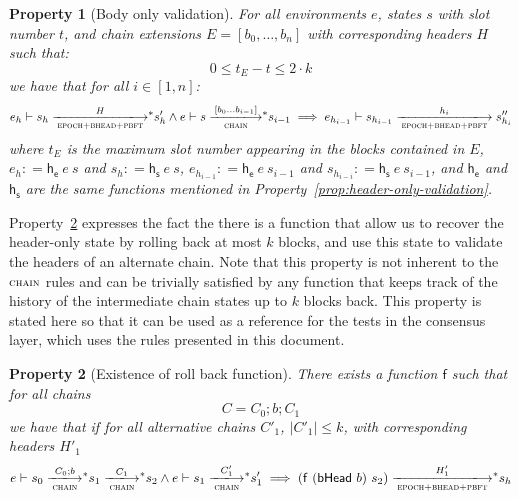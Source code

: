 \documentclass[11pt,a4paper]{article}
\newcommand{\fun}[1]{\mathsf{#1}}
\newcommand{\size}[1]{\left| #1 \right|}
\newcommand{\trans}[2]{\xlongrightarrow[\textsc{#1}]{#2}}
\newcommand{\stslabel}[1]{\footnotesize{\textsc{#1}}}
\newcommand{\leteq}{\ensuremath{\mathrel{\mathop:}=}}
\newcommand{\transtar}[2]{\xlongrightarrow[\textsc{#1}]{#2}\negthickspace^{*}}
\newtheorem{property}{Property}
\begin{document}
\begin{property}[Body only validation]\label{prop:body-only-validation}
  For all environments $e$, states $s$ with slot number $t$, and chain
  extensions $E = [b_0, \ldots, b_n]$ with corresponding headers $H$ such that:
  $$
  0 \leq t_E - t  \leq 2 \cdot k
  $$
  we have that for all $i \in [1, n]$:
  $$
  e_h \vdash s_h \transtar{epoch+bhead+pbft}{H} s'_h
  \wedge
  e \vdash s \transtar{chain}{[b_0 \ldots b_{i-1}]} s_{i-1}
  \implies
  e_{h_{i-1}} \vdash s_{h_{i-1}}\trans{epoch+bhead+pbft}{h_i} s''_{h_{i}}
  $$
  where $t_E$ is the maximum slot number appearing in the blocks contained in
  $E$, $e_h \leteq \fun{h_e}~e~s$ and $s_h \leteq \fun{h_s}~e~s$,
  $e_{h_{i-1}} \leteq \fun{h_e}~e~s_{i-1}$ and
  $s_{h_{i-i}} \leteq \fun{h_s}~e~s_{i-1}$, and $\fun{h_e}$ and $\fun{h_s}$ are
  the same functions mentioned in Property~\ref{prop:header-only-validation}.
\end{property}

Property~\ref{prop:roll-back-funk} expresses the fact the there is a function
that allow us to recover the header-only state by rolling back at most $k$
blocks, and use this state to validate the headers of an alternate chain. Note
that this property is not inherent to the $\stslabel{chain}$ rules and can be
trivially satisfied by any function that keeps track of the history of the
intermediate chain states up to $k$ blocks back. This property is stated here
so that it can be used as a reference for the tests in the consensus layer,
which uses the rules presented in this document.

\begin{property}[Existence of roll back function]\label{prop:roll-back-funk}
  There exists a function $\fun{f}$ such that for all chains
  $$C = C_0 ; b; C_1$$
  we have that if for all alternative chains $C'_1$, $\size{C'_1} \leq k$, with
  corresponding headers $H'_1$
  $$
  e \vdash s_0 \transtar{chain}{C_0;b} s_1 \transtar{chain}{C_1} s_2
  \wedge
  e \vdash s_1 \transtar{chain}{C_1'} s'_1
  \implies
  (\fun{f}~(\bhead{b})~s_2) \transtar{epoch+bhead+pbft}{H'_1} s_h
  $$
\end{property}

\clearpage



\end{document}
